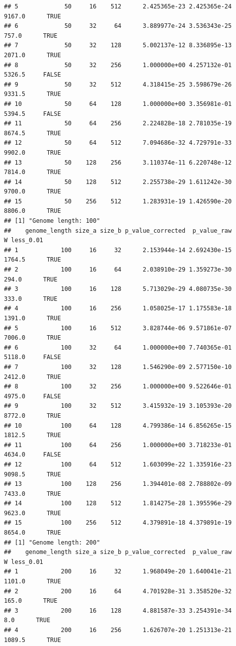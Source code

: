 \documentclass[]{book}
\begin{document}
\begin{verbatim}
## 5             50     16    512      2.425365e-23 2.425365e-24 9167.0      TRUE
## 6             50     32     64      3.889977e-24 3.536343e-25  757.0      TRUE
## 7             50     32    128      5.002137e-12 8.336895e-13 2071.0      TRUE
## 8             50     32    256      1.000000e+00 4.257132e-01 5326.5     FALSE
## 9             50     32    512      4.318415e-25 3.598679e-26 9331.5      TRUE
## 10            50     64    128      1.000000e+00 3.356981e-01 5394.5     FALSE
## 11            50     64    256      2.224828e-18 2.781035e-19 8674.5      TRUE
## 12            50     64    512      7.094686e-32 4.729791e-33 9902.0      TRUE
## 13            50    128    256      3.110374e-11 6.220748e-12 7814.0      TRUE
## 14            50    128    512      2.255738e-29 1.611242e-30 9700.0      TRUE
## 15            50    256    512      1.283931e-19 1.426590e-20 8806.0      TRUE
## [1] "Genome length: 100"
##    genome_length size_a size_b p_value_corrected  p_value_raw      W less_0.01
## 1            100     16     32      2.153944e-14 2.692430e-15 1764.5      TRUE
## 2            100     16     64      2.038910e-29 1.359273e-30  294.0      TRUE
## 3            100     16    128      5.713029e-29 4.080735e-30  333.0      TRUE
## 4            100     16    256      1.058025e-17 1.175583e-18 1391.0      TRUE
## 5            100     16    512      3.828744e-06 9.571861e-07 7006.0      TRUE
## 6            100     32     64      1.000000e+00 7.740365e-01 5118.0     FALSE
## 7            100     32    128      1.546290e-09 2.577150e-10 2412.0      TRUE
## 8            100     32    256      1.000000e+00 9.522646e-01 4975.0     FALSE
## 9            100     32    512      3.415932e-19 3.105393e-20 8772.0      TRUE
## 10           100     64    128      4.799386e-14 6.856265e-15 1812.5      TRUE
## 11           100     64    256      1.000000e+00 3.718233e-01 4634.0     FALSE
## 12           100     64    512      1.603099e-22 1.335916e-23 9098.5      TRUE
## 13           100    128    256      1.394401e-08 2.788802e-09 7433.0      TRUE
## 14           100    128    512      1.814275e-28 1.395596e-29 9623.0      TRUE
## 15           100    256    512      4.379891e-18 4.379891e-19 8654.0      TRUE
## [1] "Genome length: 200"
##    genome_length size_a size_b p_value_corrected  p_value_raw      W less_0.01
## 1            200     16     32      1.968049e-20 1.640041e-21 1101.0      TRUE
## 2            200     16     64      4.701928e-31 3.358520e-32  165.0      TRUE
## 3            200     16    128      4.881587e-33 3.254391e-34    8.0      TRUE
## 4            200     16    256      1.626707e-20 1.251313e-21 1089.5      TRUE

\end{verbatim}
\end{document}
